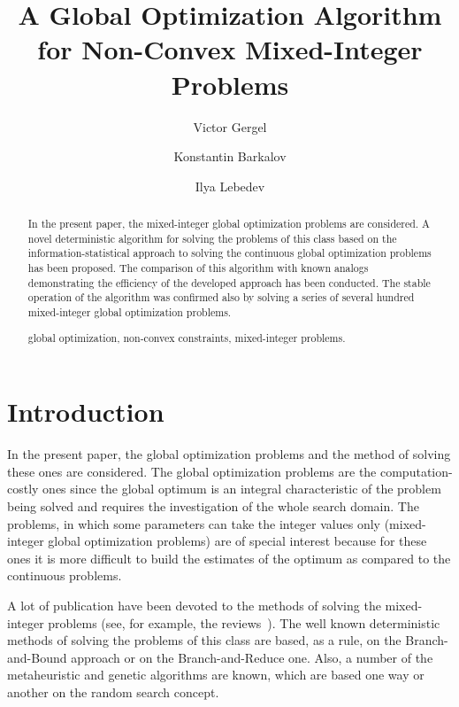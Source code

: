 \documentclass{llncs}
\begin{document}
\mainmatter 

\title{A Global Optimization Algorithm for Non-Convex Mixed-Integer Problems}
\author{Victor Gergel \and Konstantin Barkalov \and Ilya Lebedev %
\\
}


\maketitle

\begin{abstract}
In the present paper, the mixed-integer global optimization problems are considered. A novel 
deterministic algorithm for solving the problems of this class based on the information-statistical 
approach to solving the continuous global optimization problems has been proposed. The 
comparison of this algorithm with known analogs demonstrating the efficiency of the 
developed approach has been conducted. The stable operation of the algorithm was confirmed 
also by solving a series of several hundred mixed-integer global optimization problems. 

\keywords global optimization, non-convex constraints, mixed-integer problems.

\end{abstract}

\section{Introduction}\label{sec:intro}

In the present paper, the global optimization problems and the method of solving these ones are 
considered. The global optimization problems are the computation-costly ones since the global 
optimum is an integral characteristic of the problem being solved and requires the investigation 
of the whole search domain. 
The problems, in which some parameters can take the integer values only (mixed-integer global 
optimization problems) are of special interest because for these ones it is more difficult to build 
the estimates of the optimum as compared to the continuous problems.

A lot of publication have been devoted to the methods of solving the mixed-integer problems 
(see, for example, the reviews~\cite{Burer,Boukouvala}). The well known deterministic 
methods of solving the problems of this class are based, as a rule, on the Branch-and-Bound 
approach or on the Branch-and-Reduce one. Also, a number of the metaheuristic and genetic 
algorithms are known, which are based one way or another on the random search concept.
\end{document}
